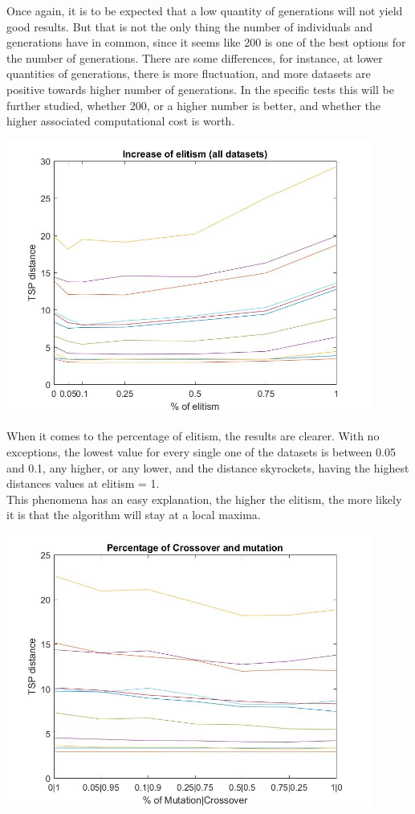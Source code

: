 Once again, it is to be expected that a low quantity of generations will not
yield good results. But that is not the only thing the number of
individuals and generations have in common, since it seems like 200 is one of
the best options for the number of generations. There are some
differences, for instance, at lower quantities of generations, there is more
fluctuation, and more datasets are positive towards higher number of
generations. In the specific tests this will be further studied, whether
200, or a higher number is better, and whether the higher
associated computational cost is worth.

\begin{center}
\includegraphics[width=12cm]{img/xalt_edges/elitism.jpg}
\end{center}

When it comes to the percentage of elitism, the results are clearer.
With no exceptions, the lowest value for every single one of the datasets
is between 0.05 and 0.1, any higher, or any lower, and the distance
skyrockets, having the highest distances values at elitism = 1. \\
This phenomena has an easy explanation, the higher the elitism, the more likely it is that the
algorithm will stay at a local maxima. \\

\begin{center}
\includegraphics[width=12cm]{img/xalt_edges/crossMut.jpg}
\end{center}

